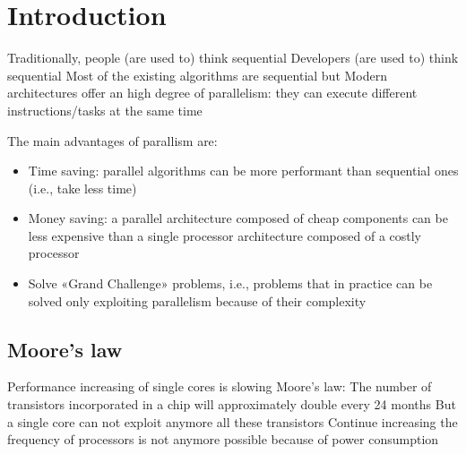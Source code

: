 \section{Introduction}

Traditionally, people (are used to) think sequential
Developers (are used to) think sequential
Most of the existing algorithms are sequential
but Modern architectures offer an high degree of
parallelism: they can execute different
instructions/tasks at the same time

The main advantages of parallism are: 
\begin{itemize}
    \item Time saving: parallel algorithms can be more performant than sequential ones (i.e., take less time)
    \item Money saving: a parallel architecture composed of cheap components can be less expensive than a single processor architecture composed of a costly processor
    \item Solve «Grand Challenge» problems, i.e., problems that in practice can be solved only exploiting parallelism because of their complexity
\end{itemize}

\subsection{Moore's law}
Performance increasing of single cores is slowing
Moore’s law:
The number of transistors incorporated in a chip
will approximately double every 24 months
But a single core can not exploit anymore all these
transistors
Continue increasing the frequency of processors is
not anymore possible because of power
consumption

